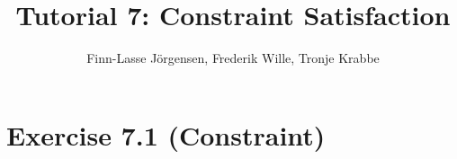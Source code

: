 \documentclass[12pt,a4paper]{article}
\author{Finn-Lasse Jörgensen, Frederik Wille, Tronje Krabbe}
\title{Tutorial 7: Constraint Satisfaction}
\begin{document}
\maketitle


\section*{Exercise 7.1 (Constraint)}
\end{document}
